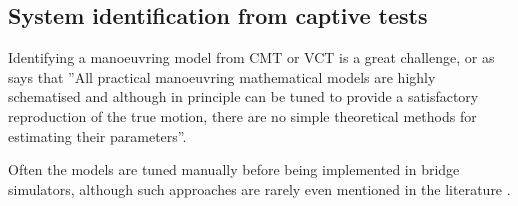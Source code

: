 \subsection{System identification from captive tests} \label{sec:literature_VCT}
Identifying a manoeuvring model from CMT or VCT is a great challenge, or as \textcite{sutulo_algorithm_2014} says that ''All practical manoeuvring mathematical models are highly schematised and although in principle can be tuned to provide a satisfactory reproduction of the true motion, there are no simple theoretical methods for estimating their parameters''.

Often the models are tuned manually before being implemented in bridge simulators, although such approaches are rarely even mentioned in the literature \cite{sutulo_algorithm_2014}.